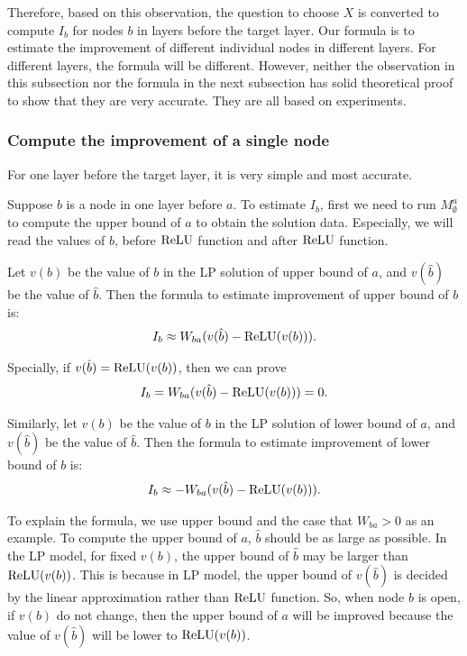 Therefore, based on this observation, the question to choose $X$ is converted to compute $I_b$ for nodes $b$ in layers before the target layer. Our formula is to estimate the improvement of different individual nodes in different layers. For different layers, the formula will be different.  However, neither the observation in this subsection nor the formula in the next subsection has solid theoretical proof to show that they are very accurate. They are all based on experiments. 

\subsubsection*{Compute the improvement of a single node}


For one layer before the target layer, it is very simple and most accurate. 

Suppose $b$ is a node in one layer before $a$. To estimate $I_b$, first we need to run $M^a_{\emptyset}$ to compute the upper bound of $a$  to obtain the solution data. Especially, we will read the values of $b$, before $\mathrm{ReLU}$ function and after $\mathrm{ReLU}$ function.

\begin{definition}
	Let $v(b)$ be the value of $b$ in the LP solution of upper bound of $a$, and $v(\hat{b})$ be the value of $\hat{b}$.	Then the formula to estimate improvement of upper bound of $b$ is: \begin{align}
		I_b \approx W_{ba}(v(\hat{b})-\mathrm{ReLU}(v(b))).
	\end{align}
	
	Specially, if $v(\hat{b})=\mathrm{ReLU}(v(b))$, then we can prove \begin{align*}
		I_b = W_{ba}(v(\hat{b})-\mathrm{ReLU}(v(b))) = 0.
	\end{align*}
	
	
	Similarly, let $v(b)$ be the value of $b$ in the LP solution of lower bound of $a$, and $v(\hat{b})$ be the value of $\hat{b}$. Then the formula to estimate improvement of lower bound of $b$ is: \begin{align*}
		I_b \approx -W_{ba}(v(\hat{b})-\mathrm{ReLU}(v(b))).
	\end{align*}
	
\end{definition}

To explain the formula, we use upper bound and the case that $W_{ba} > 0$ as an example. To compute the upper bound of $a$, $\hat{b}$ should be as large as possible. In the LP model, for fixed $v(b)$, the upper bound of $\hat{b}$ may be larger than $\mathrm{ReLU}(v(b))$. This is because in LP model, the upper bound of $v(\hat{b})$ is decided by the linear approximation rather than $\mathrm{ReLU}$ function. So, when node $b$ is open, if $v(b)$ do not change, then the upper bound of $a$ will be improved because the value of $v(\hat{b})$ will be lower to $\mathrm{ReLU}(v(b))$.
 			
